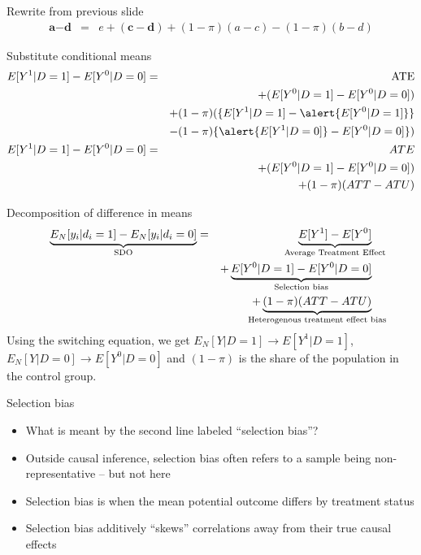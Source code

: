 \documentclass{beamer}
\begin{document}
\begin{frame}[shrink=20,plain]
  \begin{block}{Rewrite from previous slide}
    \begin{eqnarray*}
      \textbf{a}-\textbf{d}&=&e  + (\textbf{c} - \textbf{d}) + (1-\pi)(a-c) -(1-\pi)(b-d)
    \end{eqnarray*}
  \end{block}

  \begin{block}{Substitute conditional means}
    \begin{eqnarray*}
      E[Y^1|D=1] - E[Y^0|D=0] &=& \text{ATE}  \\
      &&+ (E[Y^0|D=1] - E[Y^0|D=0])  \\
      && + (1-\pi)(\{E[Y^1|D=1] - \alert{E[Y^0|D=1]}\}  \\
      && - (1-\pi)\{\alert{E[Y^1|D=0]} - E[Y^0|D=0]\}) \\
      E[Y^1 | D=1] - E[Y^0 | D=0]  &=& ATE \\
      &&+ (E[Y^0|D=1] - E[Y^0|D=0])  \\
      && + (1-\pi)(ATT - ATU)
    \end{eqnarray*}
  \end{block}
\end{frame}

\begin{frame}[plain]

  \begin{block}{Decomposition of difference in means}
    \begin{eqnarray*}
      \underbrace{E_N[y_i | d_i=1] - E_N[y_i | d_i=0]}_{ \mathclap{\text{SDO}}}&=& \underbrace{E[Y^1] - E[Y^0]}_{ \mathclap{\text{Average Treatment Effect}}} \\
      &&+ \underbrace{E[Y^0|D=1] - E[Y^0 | D=0]}_{ \mathclap{\text{Selection bias}}}  \\
      && + \underbrace{(1-\pi)(ATT - ATU)}_{ \mathclap{\text{Heterogenous treatment effect bias}}}
    \end{eqnarray*}
    Using the switching equation, we get $E_N[Y|D=1] \to E[Y^1 | D=1]$, $E_N[Y|D=0] \to E[Y^0|D=0]$ and $(1-\pi)$ is the share of the population in the control group.
  \end{block}

\end{frame}

\begin{frame}{Selection bias}

  \begin{itemize}
    \item What is meant by the second line labeled ``selection bias''?
    \item Outside causal inference, selection bias often refers to a sample being non-representative -- but not here
    \item Selection bias is when the mean potential outcome differs by treatment status 
    \item Selection bias additively ``skews'' correlations away from their true causal effects 
  \end{itemize}

\end{frame}
\end{document}
